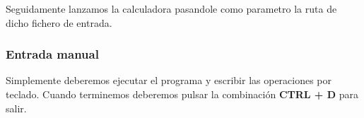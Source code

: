 \documentclass[12pt]{article}
\begin{document}
Seguidamente lanzamos la calculadora pasandole como parametro la ruta de dicho fichero de entrada.

\noindent{}%

\noindent{}%

\clearpage

\subsubsection{Entrada manual}
Simplemente deberemos ejecutar el programa y escribir las operaciones por teclado. Cuando terminemos deberemos pulsar la combinación \textbf{CTRL + D} para 
salir.

\noindent{}%

\noindent{}%
\end{document}
